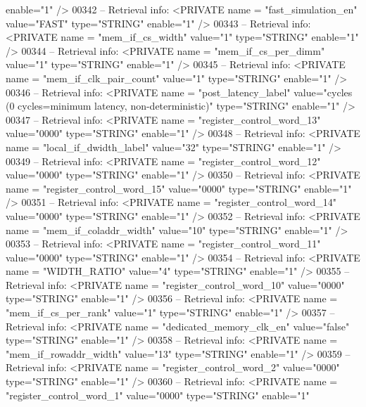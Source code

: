 \begin{DoxyCode}
{{       enable="1" />}
00342 \textcolor{keyword}{-- Retrieval info:      <PRIVATE name = "fast\_simulation\_en" value="FAST"  type="STRING"  enable="1" />}
00343 \textcolor{keyword}{-- Retrieval info:      <PRIVATE name = "mem\_if\_cs\_width" value="1"  type="STRING"  enable="1" />}
00344 \textcolor{keyword}{-- Retrieval info:      <PRIVATE name = "mem\_if\_cs\_per\_dimm" value="1"  type="STRING"  enable="1" />}
00345 \textcolor{keyword}{-- Retrieval info:      <PRIVATE name = "mem\_if\_clk\_pair\_count" value="1"  type="STRING"  enable="1" />}
00346 \textcolor{keyword}{-- Retrieval info:      <PRIVATE name = "post\_latency\_label" value="cycles (0 cycles=minimum latency,
       non-deterministic)"  type="STRING"  enable="1" />}
00347 \textcolor{keyword}{-- Retrieval info:      <PRIVATE name = "register\_control\_word\_13" value="0000"  type="STRING"  enable="1"
       />}
00348 \textcolor{keyword}{-- Retrieval info:      <PRIVATE name = "local\_if\_dwidth\_label" value="32"  type="STRING"  enable="1" />}
00349 \textcolor{keyword}{-- Retrieval info:      <PRIVATE name = "register\_control\_word\_12" value="0000"  type="STRING"  enable="1"
       />}
00350 \textcolor{keyword}{-- Retrieval info:      <PRIVATE name = "register\_control\_word\_15" value="0000"  type="STRING"  enable="1"
       />}
00351 \textcolor{keyword}{-- Retrieval info:      <PRIVATE name = "register\_control\_word\_14" value="0000"  type="STRING"  enable="1"
       />}
00352 \textcolor{keyword}{-- Retrieval info:      <PRIVATE name = "mem\_if\_coladdr\_width" value="10"  type="STRING"  enable="1" />}
00353 \textcolor{keyword}{-- Retrieval info:      <PRIVATE name = "register\_control\_word\_11" value="0000"  type="STRING"  enable="1"
       />}
00354 \textcolor{keyword}{-- Retrieval info:      <PRIVATE name = "WIDTH\_RATIO" value="4"  type="STRING"  enable="1" />}
00355 \textcolor{keyword}{-- Retrieval info:      <PRIVATE name = "register\_control\_word\_10" value="0000"  type="STRING"  enable="1"
       />}
00356 \textcolor{keyword}{-- Retrieval info:      <PRIVATE name = "mem\_if\_cs\_per\_rank" value="1"  type="STRING"  enable="1" />}
00357 \textcolor{keyword}{-- Retrieval info:      <PRIVATE name = "dedicated\_memory\_clk\_en" value="false"  type="STRING"  enable="1"
       />}
00358 \textcolor{keyword}{-- Retrieval info:      <PRIVATE name = "mem\_if\_rowaddr\_width" value="13"  type="STRING"  enable="1" />}
00359 \textcolor{keyword}{-- Retrieval info:      <PRIVATE name = "register\_control\_word\_2" value="0000"  type="STRING"  enable="1"
       />}
00360 \textcolor{keyword}{-- Retrieval info:      <PRIVATE name = "register\_control\_word\_1" value="0000"  type="STRING"  enable="1"
}}
\end{DoxyCode}
